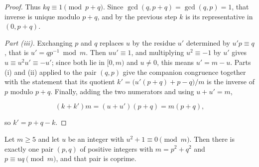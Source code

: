 \begin{proof}
Thus $kq\equiv1\pmod{p+q}$. Since $\gcd(q,p+q)=\gcd(q,p)=1$, that inverse is
unique modulo $p+q$, and by the previous step $k$ is its representative in
$(0,p+q)$.

\emph{Part (iii).} Exchanging $p$ and $q$ replaces $u$ by the residue $u'$
determined by $u'p\equiv q$, that is $u'=qp^{-1}\bmod m$. Then $uu'\equiv1$,
and multiplying $u^2\equiv-1$ by $u'$ gives $u\equiv u^2u'\equiv-u'$; since
both lie in $[0,m)$ and $u\neq0$, this means $u'=m-u$. Parts (i) and (ii)
applied to the pair $(q,p)$ give the companion congruence together with the
statement that its quotient $k'=\bigl(u'(p+q)+p-q\bigr)/m$ is the inverse of
$p$ modulo $p+q$. Finally, adding the two numerators and using $u+u'=m$,

\begin{equation}
 (k+k')m=(u+u')(p+q)=m(p+q),
\end{equation}

so $k'=p+q-k$.
\end{proof}

\begin{proposition}
\label{prop:writing-from-root}
Let $m\geqslant5$ and let $u$ be an integer with $u^2+1\equiv0\pmod m$. Then
there is exactly one pair $(p,q)$ of positive integers with $m=p^2+q^2$ and
$p\equiv uq\pmod m$, and that pair is coprime.
\end{proposition}

